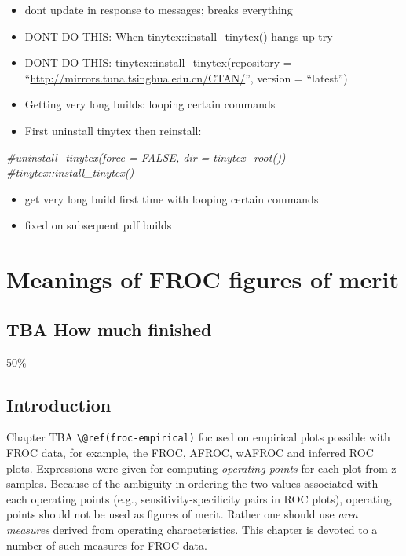 \documentclass[
]{book}
\newenvironment{Shaded}{\begin{snugshade}}{\end{snugshade}}
\newcommand{\CommentTok}[1]{\textcolor[rgb]{0.56,0.35,0.01}{\textit{#1}}}
\providecommand{\tightlist}{%
  \setlength{\itemsep}{0pt}\setlength{\parskip}{0pt}}
\begin{document}
\begin{itemize}
\tightlist
\item
  dont update in response to messages; breaks everything
\item
  DONT DO THIS: When tinytex::install\_tinytex() hangs up try
\item
  DONT DO THIS: tinytex::install\_tinytex(repository = ``\url{http://mirrors.tuna.tsinghua.edu.cn/CTAN/}'', version = ``latest'')
\item
  Getting very long builds: looping certain commands
\item
  First uninstall tinytex then reinstall:
\end{itemize}

\begin{Shaded}
\begin{Highlighting}[]
\CommentTok{#uninstall_tinytex(force = FALSE, dir = tinytex_root())}
\CommentTok{#tinytex::install_tinytex()}
\end{Highlighting}
\end{Shaded}

\begin{itemize}
\tightlist
\item
  get very long build first time with looping certain commands
\item
  fixed on subsequent pdf builds
\end{itemize}

\hypertarget{froc-meanings}{%
\chapter{Meanings of FROC figures of merit}\label{froc-meanings}}

\hypertarget{froc-meanings-how-much-finished}{%
\section{TBA How much finished}\label{froc-meanings-how-much-finished}}

50\%

\hypertarget{froc-meanings-intro}{%
\section{Introduction}\label{froc-meanings-intro}}

Chapter TBA \texttt{\textbackslash{}@ref(froc-empirical)} focused on empirical plots possible with FROC data, for example, the FROC, AFROC, wAFROC and inferred ROC plots. Expressions were given for computing \emph{operating points} for each plot from z-samples. Because of the ambiguity in ordering the two values associated with each operating points (e.g., sensitivity-specificity pairs in ROC plots), operating points should not be used as figures of merit. Rather one should use \emph{area measures} derived from operating characteristics. This chapter is devoted to a number of such measures for FROC data.
\end{document}
